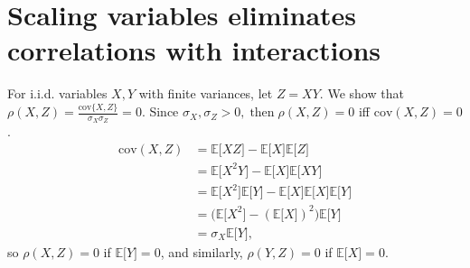 \chapter{Scaling variables eliminates correlations with interactions}
\label{app:B}
For i.i.d. variables $X,Y$ with finite variances, let $Z=XY$. We show that $\rho(X,Z)=\frac{\text{cov}\{X,Z\}}{\sigma_X \sigma_Z} = 0$. Since $\sigma_X,\sigma_Z > 0,\;\text{then}\;\rho(X,Z) = 0$ iff $\text{cov}(X,Z)=0$.
\begin{equation*}
    \begin{split}
        \text{cov}(X,Z)&=\mathbb{E}\lbrack XZ \rbrack - \mathbb{E}\lbrack X \rbrack \mathbb{E} \lbrack Z \rbrack \\
        &= \mathbb{E}\lbrack X^2 Y \rbrack - \mathbb{E} \lbrack X \rbrack \mathbb{E} \lbrack XY \rbrack \\
        &= \mathbb{E} \lbrack X^2 \rbrack \mathbb{E} \lbrack Y \rbrack - \mathbb{E} \lbrack X \rbrack \mathbb{E} \lbrack X \rbrack \mathbb{E} \lbrack Y \rbrack \\
        &=\big(\mathbb{E} \lbrack X^2 \rbrack - (\mathbb{E} \lbrack X \rbrack)^2\big) \mathbb{E} \lbrack Y \rbrack \\
        &= \sigma_X \mathbb{E} \lbrack Y \rbrack,
    \end{split}
\end{equation*}
so $\rho(X,Z) = 0$ if $\mathbb{E} \lbrack Y \rbrack = 0$, and similarly, $\rho(Y,Z) = 0$ if $\mathbb{E} \lbrack X \rbrack = 0$.

